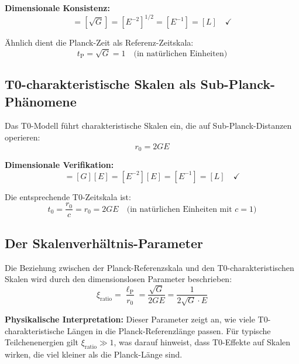 \documentclass[12pt,a4paper]{report}
\newcommand{\lP}{\ell_{\text{P}}}         %
\newcommand{\tP}{t_{\text{P}}}            %
\newcommand{\rzero}{r_0}                  %
\newcommand{\tzero}{t_0}                  %
\newcommand{\xirat}{\xi_{\text{ratio}}}   %
\begin{document}
	\textbf{Dimensionale Konsistenz:}
	\begin{equation}
		[\lP] = [\sqrt{G}] = [E^{-2}]^{1/2} = [E^{-1}] = [L] \quad \checkmark
	\end{equation}
	
	Ähnlich dient die Planck-Zeit als Referenz-Zeitskala:
	\begin{equation}
		\tP = \sqrt{G} = 1 \quad \text{(in natürlichen Einheiten)}
	\end{equation}
	
	\subsection{T0-charakteristische Skalen als Sub-Planck-Phänomene}\label{subsec:t0_sub_planck}
	
	Das T0-Modell führt charakteristische Skalen ein, die auf Sub-Planck-Distanzen operieren:
	\begin{equation}
		\boxed{\rzero = 2GE}
		\label{eq:t0_characteristic_length}
	\end{equation}
	
	\textbf{Dimensionale Verifikation:}
	\begin{equation}
		[\rzero] = [G][E] = [E^{-2}][E] = [E^{-1}] = [L] \quad \checkmark
	\end{equation}
	
	Die entsprechende T0-Zeitskala ist:
	\begin{equation}
		\tzero = \frac{\rzero}{c} = \rzero = 2GE \quad \text{(in natürlichen Einheiten mit } c = 1\text{)}
	\end{equation}
	
	\subsection{Der Skalenverhältnis-Parameter}\label{subsec:scale_ratio}

Die Beziehung zwischen der Planck-Referenzskala und den T0-charakteristischen Skalen wird durch den dimensionslosen Parameter beschrieben:
\begin{equation}
	\boxed{\xirat = \frac{\lP}{\rzero} = \frac{\sqrt{G}}{2GE} = \frac{1}{2\sqrt{G} \cdot E}}
	\label{eq:scale_ratio}
\end{equation}

\textbf{Physikalische Interpretation:} Dieser Parameter zeigt an, wie viele T0-charakteristische Längen in die Planck-Referenzlänge passen. Für typische Teilchenenergien gilt $\xirat \gg 1$, was darauf hinweist, dass T0-Effekte auf Skalen wirken, die viel kleiner als die Planck-Länge sind.
\end{document}
